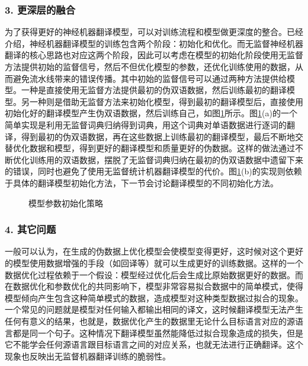 \subsubsection{3. 更深层的融合}

\parinterval 为了获得更好的神经机器翻译模型，可以对训练流程和模型做更深度的整合。{\chapterten}已经介绍，神经机器翻译模型的训练包含两个阶段：初始化和优化。而无监督神经机器翻译的核心思路也对应这两个阶段，因此可以考虑在模型的初始化阶段使用无监督方法提供初始的监督信号，然后不但优化模型的参数，还优化训练使用的数据，从而避免流水线带来的错误传播。其中初始的监督信号可以通过两种方法提供给模型。一种是直接使用无监督方法提供最初的伪双语数据，然后训练最初的翻译模型。另一种则是借助无监督方法来初始化模型，得到最初的翻译模型后，直接使用初始化好的翻译模型产生伪双语数据，然后训练自己，如图\ref{fig:16-18}所示。图\ref{fig:16-18}(a)的一个简单实现是利用无监督词典归纳得到词典，用这个词典对单语数据进行逐词的翻译，得到最初的伪双语数据，再在这些数据上训练最初的翻译模型，最后不断地交替优化数据和模型，得到更好的翻译模型和质量更好的伪数据。这样的做法通过不断优化训练用的双语数据，摆脱了无监督词典归纳在最初的伪双语数据中遗留下来的错误，同时也避免了使用无监督统计机器翻译模型的代价。图\ref{fig:16-18}(b)的实现则依赖于具体的翻译模型初始化方法，下一节会讨论翻译模型的不同初始化方法。
\begin{figure}[h]
\centering

\caption{模型参数初始化策略}
\label{fig:16-18}
\end{figure}

\subsubsection{4. 其它问题}

\parinterval 一般可以认为，在生成的伪数据上优化模型会使模型变得更好，这时候对这个更好的模型使用数据增强的手段（如回译等）就可以生成更好的训练数据。这样的一个数据优化过程依赖于一个假设：模型经过优化后会生成比原始数据更好的数据。而在数据优化和参数优化的共同影响下，模型非常容易拟合数据中的简单模式，使得模型倾向产生包含这种简单模式的数据，造成模型对这种类型数据过拟合的现象。一个常见的问题就是模型对任何输入都输出相同的译文，这时候翻译模型无法产生任何有意义的结果，也就是，数据优化产生的数据里无论什么目标语言对应的源语言都是同一个句子。这种情况下翻译模型虽然能降低过拟合现象造成的损失，但是它不能学会任何源语言跟目标语言之间的对应关系，也就无法进行正确翻译。这个现象也反映出无监督机器翻译训练的脆弱性。

